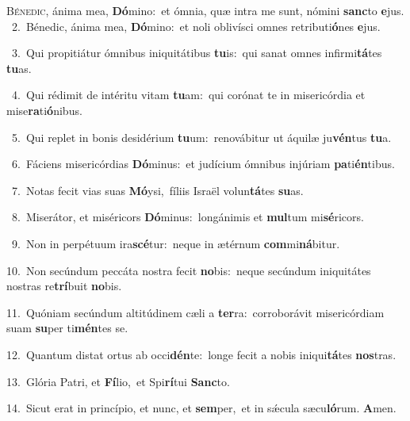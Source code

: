 \lettrine{\initial\textcolor{\initialcolor}{B}}{énedic,} ánima mea, \textbf{Dó}\-mino:~\star et ómnia, quæ intra me sunt, nómini \textbf{sanc}\-to \textbf{e}\-jus.\\
{\numbfont\textcolor{\numbcolor}{~2.}}~Bénedic, ánima mea, \textbf{Dó}\-mino:~\star et noli oblivísci omnes retributi\-\textbf{ó}\-nes \textbf{e}\-jus.\par
{\numbfont\textcolor{\numbcolor}{~3.}}~Qui propitiátur ómnibus iniquitátibus \textbf{tu}\-is:~\star qui sanat omnes infirmi\-\textbf{tá}\-tes \textbf{tu}\-as.\par
{\numbfont\textcolor{\numbcolor}{~4.}}~Qui rédimit de intéritu vitam \textbf{tu}\-am:~\star qui corónat te in misericórdia et mise\-\textbf{ra}\-ti\-\textbf{ó}\-nibus.\par
{\numbfont\textcolor{\numbcolor}{~5.}}~Qui replet in bonis desidérium \textbf{tu}\-um:~\star renovábitur ut áquilæ ju\-\textbf{vén}\-tus \textbf{tu}\-a.\par
{\numbfont\textcolor{\numbcolor}{~6.}}~Fáciens misericórdias \textbf{Dó}\-minus:~\star et judícium ómnibus injúriam \textbf{pa}\-ti\-\textbf{én}\-tibus.\par
{\numbfont\textcolor{\numbcolor}{~7.}}~Notas fecit vias suas \textbf{Mó}\-ysi,~\star fíliis Israël volun\-\textbf{tá}\-tes \textbf{su}\-as.\par
{\numbfont\textcolor{\numbcolor}{~8.}}~Miserátor, et miséricors \textbf{Dó}\-minus:~\star longánimis et \textbf{mul}\-tum mi\-\textbf{sé}\-ricors.\par
{\numbfont\textcolor{\numbcolor}{~9.}}~Non in perpétuum ira\-\textbf{scé}\-tur:~\star neque in ætérnum \textbf{com}\-mi\-\textbf{ná}\-bitur.\par
{\numbfont\textcolor{\numbcolor}{10.}}~Non secúndum peccáta nostra fecit \textbf{no}\-bis:~\star neque secúndum iniquitátes nostras re\-\textbf{trí}\-buit \textbf{no}\-bis.\par
{\numbfont\textcolor{\numbcolor}{11.}}~Quóniam secúndum altitúdinem cæli a \textbf{ter}\-ra:~\star corroborávit misericórdiam suam \textbf{su}\-per ti\-\textbf{mén}\-tes se.\par
{\numbfont\textcolor{\numbcolor}{12.}}~Quantum distat ortus ab occi\-\textbf{dén}\-te:~\star longe fecit a nobis iniqui\-\textbf{tá}\-tes \textbf{nos}\-tras.\par
{\numbfont\textcolor{\numbcolor}{13.}}~Glória Patri, et \textbf{Fí}\-lio,~\star et Spi\-\textbf{rí}\-tui \textbf{Sanc}\-to.\par
{\numbfont\textcolor{\numbcolor}{14.}}~Sicut erat in princípio, et nunc, et \textbf{sem}\-per,~\star et in sǽcula sæcu\-\textbf{ló}\-rum. \textbf{A}\-men.\par
